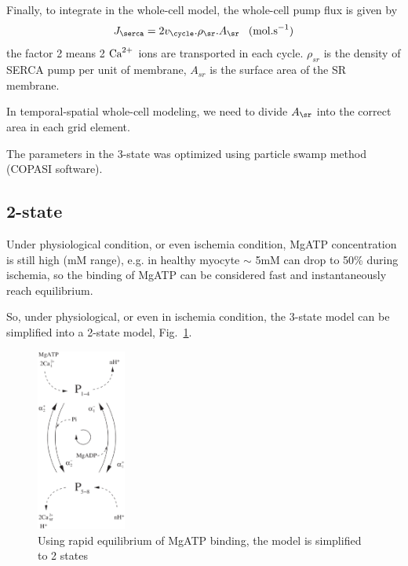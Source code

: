 Finally, to integrate in the whole-cell model, the whole-cell pump
flux is given by
\begin{equation}
  \label{eq:988}
  J_\serca = 2v_\cycle. \rho_\sr .A_\sr \;\;\; (\text{mol.s}^{-1})
\end{equation}
the factor 2 means 2 ${\text{Ca}^{2+}}$ ions are transported in each cycle.
$\rho_{sr}$ is the density of SERCA pump per unit of membrane,
$A_{sr}$ is the surface area of the SR membrane.

\begin{framed}
  In temporal-spatial whole-cell modeling, we need to divide $A_\sr$
  into the correct area in each grid element. 
\end{framed}

The parameters in the 3-state was optimized using particle swamp
method (COPASI software). 

\subsection{2-state}
\label{sec:2-state}

Under physiological condition, or even ischemia condition, MgATP
concentration is still high (mM range), e.g. in healthy myocyte $\sim$
5mM can drop to 50\% during ischemia, so the binding of MgATP can be
considered fast and instantaneously reach equilibrium. 

So, under physiological, or even in ischemia condition, the 3-state
model can be simplified into a 2-state model,
Fig.~\ref{fig:Tran_2state}.

\begin{figure}[hbt]
  \centerline{\includegraphics[height=6cm,
    angle=0]{./images/Tran_2state.eps}}
\caption{Using rapid equilibrium of MgATP binding, the model is
  simplified to 2 states}
\label{fig:Tran_2state}
\end{figure}

